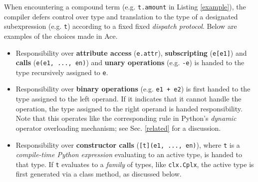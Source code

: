 \documentclass[10pt,preprint]{sigplanconf}
\begin{document}
{When encountering a compound term (e.g. \verb|t.amount| in Listing \ref{example}), the compiler defers control over type  and translation to the type of a designated subexpression (e.g. \verb|t|) according to a fixed fixed \emph{dispatch protocol}. Below are examples of the choices made in Ace.
\begin{itemize}
\item Responsibility over {\bf attribute access} (\texttt{e.attr}), {\bf subscripting} (\texttt{e[e1]}) and \textbf{calls} (\verb|e(e1, ..., en)|) and {\bf unary operations} (e.g. \verb|-e|) is handed to the type recursively assigned to \texttt{e}.
\item Responsibility over {\bf binary operations} (e.g. \verb|e1 + e2|) is first handed to the type assigned to the left operand. If it indicates that it cannot handle the operation, the type assigned to the right operand is handed responsibility. {Note that this operates like the corresponding rule in Python's \emph{dynamic} operator overloading mechanism; see Sec. \ref{related} for a discussion.}
\item Responsibility over \textbf{constructor calls} (\verb|[t](e1, ..., en)|), where \verb|t| is a \emph{compile-time Python expression} evaluating to an active type, is handed to that type. If \verb|t| evaluates to a \emph{family} of types, like \verb|clx.Cplx|, the active type is first generated via a class method, as discussed below.
\end{itemize}
%

}
\end{document}

